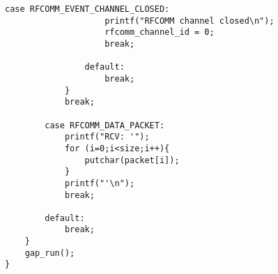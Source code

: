 \begin{lstlisting}[caption= SPP\&LE client - packet handler., label=code:spp_le_gap_run]
                case RFCOMM_EVENT_CHANNEL_CLOSED:
                    printf("RFCOMM channel closed\n");
                    rfcomm_channel_id = 0;
                    break;
                
                default:
                    break;
            }
            break;
                        
        case RFCOMM_DATA_PACKET:
            printf("RCV: '");
            for (i=0;i<size;i++){
                putchar(packet[i]);
            }
            printf("'\n");
            break;

        default:
            break;
    }
    gap_run();
}
\end{lstlisting}
